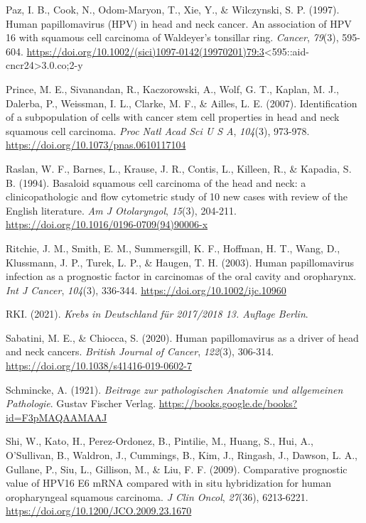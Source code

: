 Paz, I. B., Cook, N., Odom-Maryon, T., Xie, Y., \& Wilczynski, S. P. (1997). Human papillomavirus (HPV) in head and neck cancer. An association of HPV 16 with squamous cell carcinoma of Waldeyer's tonsillar ring. \emph{Cancer}, \emph{79}(3), 595-604. \url{https://doi.org/10.1002/(sici)1097-0142(19970201)79:3}\textless595::aid-cncr24\textgreater3.0.co;2-y

Prince, M. E., Sivanandan, R., Kaczorowski, A., Wolf, G. T., Kaplan, M. J., Dalerba, P., Weissman, I. L., Clarke, M. F., \& Ailles, L. E. (2007). Identification of a subpopulation of cells with cancer stem cell properties in head and neck squamous cell carcinoma. \emph{Proc Natl Acad Sci U S A}, \emph{104}(3), 973-978. \url{https://doi.org/10.1073/pnas.0610117104}

Raslan, W. F., Barnes, L., Krause, J. R., Contis, L., Killeen, R., \& Kapadia, S. B. (1994). Basaloid squamous cell carcinoma of the head and neck: a clinicopathologic and flow cytometric study of 10 new cases with review of the English literature. \emph{Am J Otolaryngol}, \emph{15}(3), 204-211. \url{https://doi.org/10.1016/0196-0709(94)90006-x}

Ritchie, J. M., Smith, E. M., Summersgill, K. F., Hoffman, H. T., Wang, D., Klussmann, J. P., Turek, L. P., \& Haugen, T. H. (2003). Human papillomavirus infection as a prognostic factor in carcinomas of the oral cavity and oropharynx. \emph{Int J Cancer}, \emph{104}(3), 336-344. \url{https://doi.org/10.1002/ijc.10960}

RKI. (2021). \emph{Krebs in Deutschland für 2017/2018 13. Auflage Berlin}.

Sabatini, M. E., \& Chiocca, S. (2020). Human papillomavirus as a driver of head and neck cancers. \emph{British Journal of Cancer}, \emph{122}(3), 306-314. \url{https://doi.org/10.1038/s41416-019-0602-7}

Schmincke, A. (1921). \emph{Beitrage zur pathologischen Anatomie und allgemeinen Pathologie}. Gustav Fischer Verlag. \url{https://books.google.de/books?id=F3pMAQAAMAAJ}

Shi, W., Kato, H., Perez-Ordonez, B., Pintilie, M., Huang, S., Hui, A., O'Sullivan, B., Waldron, J., Cummings, B., Kim, J., Ringash, J., Dawson, L. A., Gullane, P., Siu, L., Gillison, M., \& Liu, F. F. (2009). Comparative prognostic value of HPV16 E6 mRNA compared with in situ hybridization for human oropharyngeal squamous carcinoma. \emph{J Clin Oncol}, \emph{27}(36), 6213-6221. \url{https://doi.org/10.1200/JCO.2009.23.1670}

